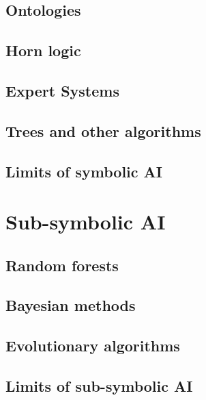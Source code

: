 \subsection{Ontologies}\label{subsec:ontologies}

\subsection{Horn logic}\label{subsec:horn-logic}

\subsection{Expert Systems}\label{subsec:expert-systems}

\subsection{Trees and other algorithms}\label{subsec:trees-and-other-algorithms}

\subsection{Limits of symbolic \Gls{AI}}\label{subsec:limits-of-symbolic-ai}

\section{Sub-symbolic \Gls{AI}}\label{sec:sub-symbolic-ai}

\subsection{Random forests}\label{subsec:random-forests}

\subsection{Bayesian methods}\label{subsec:bayesian-methods}

\subsection{Evolutionary algorithms}\label{subsec:evolutionary-algorithms}

\subsection{}\label{subsec:svm}

\subsection{}\label{subsec:neural-networks}

\subsection{Limits of sub-symbolic \Gls{AI}}\label{subsec:limits-of-sub-symbolic-ai}